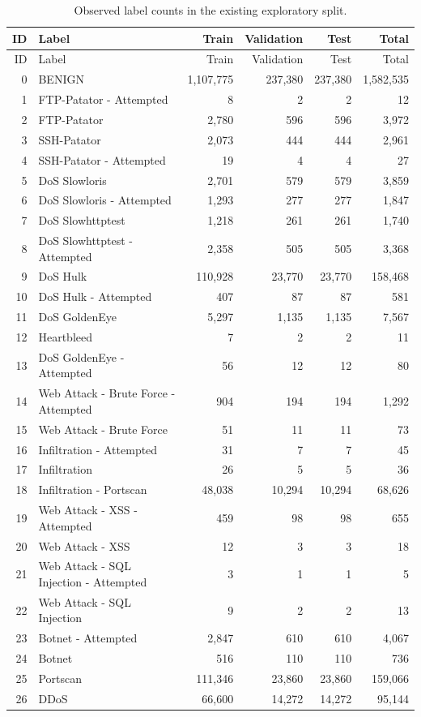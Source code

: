 \begin{longtable}{r p{} r r r r}
\caption{Observed label counts in the existing exploratory split.}\label{tab:observed-label-counts}\\
\hline ID & Label & Train & Validation & Test & Total\\\hline
\endfirsthead
\hline ID & Label & Train & Validation & Test & Total\\\hline
\endhead
0 & BENIGN & 1,107,775 & 237,380 & 237,380 & 1,582,535\\
1 & FTP-Patator - Attempted & 8 & 2 & 2 & 12\\
2 & FTP-Patator & 2,780 & 596 & 596 & 3,972\\
3 & SSH-Patator & 2,073 & 444 & 444 & 2,961\\
4 & SSH-Patator - Attempted & 19 & 4 & 4 & 27\\
5 & DoS Slowloris & 2,701 & 579 & 579 & 3,859\\
6 & DoS Slowloris - Attempted & 1,293 & 277 & 277 & 1,847\\
7 & DoS Slowhttptest & 1,218 & 261 & 261 & 1,740\\
8 & DoS Slowhttptest - Attempted & 2,358 & 505 & 505 & 3,368\\
9 & DoS Hulk & 110,928 & 23,770 & 23,770 & 158,468\\
10 & DoS Hulk - Attempted & 407 & 87 & 87 & 581\\
11 & DoS GoldenEye & 5,297 & 1,135 & 1,135 & 7,567\\
12 & Heartbleed & 7 & 2 & 2 & 11\\
13 & DoS GoldenEye - Attempted & 56 & 12 & 12 & 80\\
14 & Web Attack - Brute Force - Attempted & 904 & 194 & 194 & 1,292\\
15 & Web Attack - Brute Force & 51 & 11 & 11 & 73\\
16 & Infiltration - Attempted & 31 & 7 & 7 & 45\\
17 & Infiltration & 26 & 5 & 5 & 36\\
18 & Infiltration - Portscan & 48,038 & 10,294 & 10,294 & 68,626\\
19 & Web Attack - XSS - Attempted & 459 & 98 & 98 & 655\\
20 & Web Attack - XSS & 12 & 3 & 3 & 18\\
21 & Web Attack - SQL Injection - Attempted & 3 & 1 & 1 & 5\\
22 & Web Attack - SQL Injection & 9 & 2 & 2 & 13\\
23 & Botnet - Attempted & 2,847 & 610 & 610 & 4,067\\
24 & Botnet & 516 & 110 & 110 & 736\\
25 & Portscan & 111,346 & 23,860 & 23,860 & 159,066\\
26 & DDoS & 66,600 & 14,272 & 14,272 & 95,144\\
\hline
\end{longtable}
